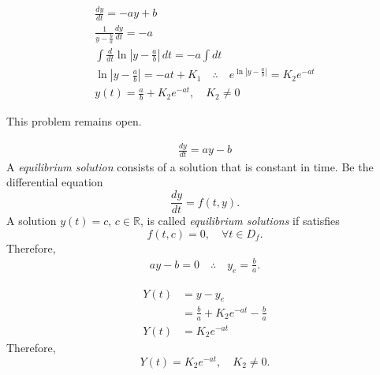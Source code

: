 \begin{solution}
	\begin{solparts}
		\item 
		\begin{gather*}
			\frac{dy}{dt}=-ay+b\\
			\frac{1}{y-\frac{b}{a}}\frac{dy}{dt}=-a\\
			\int \frac{d}{dt}\ln\left|y-\frac{a}{b}\right|\, dt=-a \int dt\\
			\ln\left|y-\frac{a}{b}\right|=-at+K_1 \quad \therefore \quad e^{\ln\left|y-\frac{a}{b}\right|}=K_2e^{-at}\\
			\boxed{y(t)=\frac{a}{b}+K_2e^{-at}, \quad K_2 \neq 0}
		\end{gather*}
		
		\item
		This problem remains open.
	\end{solparts}
\end{solution}

\begin{solution}
	\begin{solparts}
		\item 
		\begin{gather*}
			\frac{dy}{dt}=ay-b
		\end{gather*}
		A \textit{equilibrium solution} consists of a solution that is constant in time. Be the differential equation
		$$\frac{dy}{dt}=f(t,y).$$
		A solution $y(t)=c$, $c \in \mathbb{R}$, is called \textit{equilibrium solutions} if satisfies
		$$f(t,c)=0, \quad \forall t \in D_f.$$
		Therefore,
		\begin{gather*}
			ay-b=0 \quad \therefore \quad \boxed{y_e=\frac{b}{a}}.
		\end{gather*}
	
		\item
		\begin{align*}
			Y(t)&=y-y_e\\
				&=\frac{b}{a}+K_2e^{-at}-\frac{b}{a}\\
			Y(t)&=K_2e^{-at}
		\end{align*}
		Therefore,
		$$\boxed{Y(t)=K_2e^{-at}, \quad K_2 \neq 0}.$$
	\end{solparts}
\end{solution}

